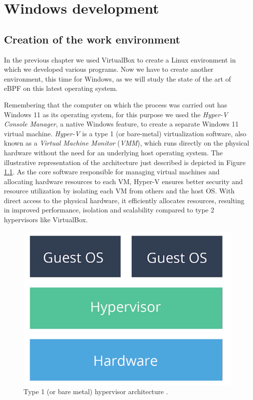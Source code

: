 \chapter{Windows development}

\section{Creation of the work environment}

In the previous chapter we used VirtualBox to create a Linux environment in which we developed various programs. 
Now we have to create another environment, this time for Windows, as we will study the state of the art of eBPF on this latest operating system.

Remembering that the computer on which the process was carried out has Windows 11 as its operating system, for this purpose we used the \textit{Hyper-V Console Manager}, a native Windows feature, to create a separate Windows 11 virtual machine.
\textit{Hyper-V} is a type 1 (or bare-metal) virtualization software, also known as a \textit{Virtual Machine Monitor} (\textit{VMM}), which runs directly on the physical hardware without the need for an underlying host operating system. 
The illustrative representation of the architecture just described is depicted in Figure \ref{fig:type_1_hypervisor}.
As the core software responsible for managing virtual machines and allocating hardware resources to each VM, Hyper-V ensures better security and resource utilization by isolating each VM from others and the host OS. 
With direct access to the physical hardware, it efficiently allocates resources, resulting in improved performance, isolation and scalability compared to type 2 hypervisors like VirtualBox.

\begin{figure}[h]
	\centering
	\includegraphics[width=0.7\linewidth]{images/Technologies/type_1_hypervisor.png}
	\caption{Type 1 (or bare metal) hypervisor architecture \cite{HypervisorsArchitectures}.}
	\label{fig:type_1_hypervisor}
\end{figure}

